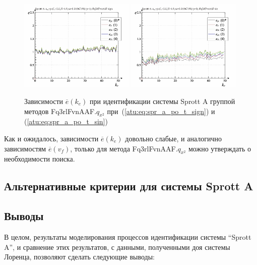 \begin{figure}[htb!]
  \centerline{
    \includegraphics[width=0.49\textwidth]{p/cha/spr_a/Fq3rlFvnAAF_x2/sprott_a_id-p_k_e_sign.png}
    \hfill
    \includegraphics[width=0.49\textwidth]{p/cha/spr_a/Fq3rlFvnAAF_x2/sprott_a_id-p_k_e_sin.png}
  }
  \caption{Зависимости $\overline{e}(k_e)$ при идентификации системы Sprott A группой методов Fq3rlFvnAAF.$q_{x^2}$
   при~(\ref{atu:eq:spr_a_po_t_sign}) и (\ref{atu:eq:spr_a_po_t_sin})}
  \label{atu:f:spr_a_k_e_Fq3rlFvnAAF_q_x2}
\end{figure}

Как и ожидалось, зависимости $\overline{e}(k_e)$
довольно слабые, и аналогично зависимостям  $\overline{e}(v_f)$,
только для метода Fq3rlFvnAAF.$q_{x^2}$ можно
утверждать о необходимости поиска.


\subsection{Альтернативные критерии для системы Sprott A}   %



\subsection{Выводы}  %

В целом, результаты моделирования процессов идентификации системы ``Sprott A'',
и сравнение этих результатов, с данными, полученными
доя системы Лоренца, позволяют сделать следующие выводы:

